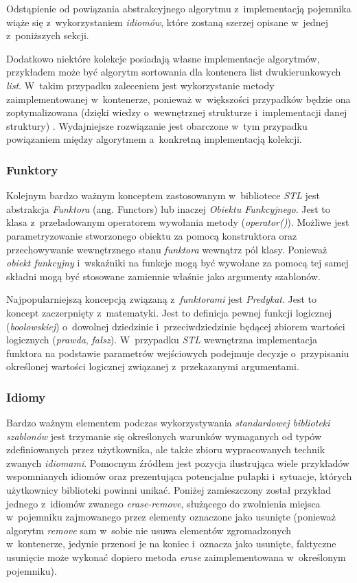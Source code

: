       Odstąpienie od powiązania abstrakcyjnego algorytmu z~implementacją pojemnika wiąże się z~wykorzystaniem \textit{idiomów}, które zostaną szerzej opisane w~jednej z~poniższych sekcji.

      Dodatkowo niektóre kolekcje posiadają własne implementacje algorytmów, przykładem może być algorytm sortowania dla kontenera list dwukierunkowych \textit{list}. W~takim przypadku zaleceniem jest wykorzystanie metody zaimplementowanej w~kontenerze, ponieważ w~większości przypadków będzie ona zoptymalizowana (dzięki wiedzy o~wewnętrznej strukturze i~implementacji danej struktury) \cite{EffectiveStl}. Wydajniejsze rozwiązanie jest obarczone w~tym przypadku powiązaniem między algorytmem a~konkretną implementacją kolekcji.

      \subsubsection{Funktory}
      Kolejnym bardzo ważnym konceptem zastosowanym w~bibliotece \textit{STL} jest abstrakcja \textit{Funktora} (ang. Functors) lub inaczej \textit{Obiektu Funkcyjnego}. Jest to klasa z~przeładowanym operatorem wywołania metody (\textit{operator()}). Możliwe jest parametryzowanie stworzonego obiektu za pomocą konstruktora oraz przechowywanie wewnętrznego stanu \textit{funktora} wewnątrz pól klasy. Ponieważ \textit{obiekt funkcyjny} i~wskaźniki na funkcje mogą być wywołane za pomocą tej samej składni mogą być stosowane zamiennie właśnie jako argumenty szablonów.

      Najpopularniejszą koncepcją związaną z~\textit{funktorami} jest \textit{Predykat}. Jest to koncept zaczerpnięty z~matematyki. Jest to definicja pewnej funkcji logicznej (\textit{boolowskiej}) o~dowolnej dziedzinie i~przeciwdziedzinie będącej zbiorem wartości logicznych (\textit{prawda}, \textit{fałsz}). W~przypadku \textit{STL} wewnętrzna implementacja funktora na podstawie parametrów wejściowych podejmuje decyzje o~przypisaniu określonej wartości logicznej związanej z~przekazanymi argumentami.

      \subsubsection{Idiomy}\label{Idioms}
      Bardzo ważnym elementem podczas wykorzystywania \textit{standardowej biblioteki szablonów} jest trzymanie się określonych warunków wymaganych od typów zdefiniowanych przez użytkownika, ale także zbioru wypracowanych technik zwanych \textit{idiomami}. Pomocnym źródłem jest pozycja \cite{EffectiveStl} ilustrująca wiele przykładów wspomnianych idiomów oraz prezentująca potencjalne pułapki i~sytuacje, których użytkownicy biblioteki powinni unikać. Poniżej zamieszczony został przykład jednego z~idiomów zwanego \textit{erase-remove}, służącego do zwolnienia miejsca w~pojemniku zajmowanego przez elementy oznaczone jako usunięte (ponieważ algorytm \textit{remove} sam w~sobie nie usuwa elementów zgromadzonych w~kontenerze, jedynie przenosi je na koniec i~oznacza jako usunięte, faktyczne usunięcie może wykonać dopiero metoda \textit{erase} zaimplementowana w~określonym pojemniku).

